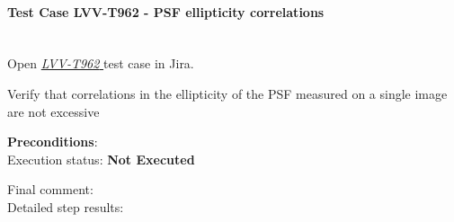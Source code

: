 \documentclass[DM,lsstdraft,STR,toc]{lsstdoc}
\begin{document}
    \paragraph{Test Case LVV-T962 - PSF ellipticity correlations
 }\mbox{}\\

Open  \href{https://jira.lsstcorp.org/secure/Tests.jspa#/testCase/LVV-T962}{\textit{ LVV-T962 } }
test case in Jira.

    Verify that correlations in the ellipticity of the PSF measured on a
single image are not excessive


    \textbf{ Preconditions}:\\
    

    Execution status: {\bf Not Executed }

    Final comment:\\


    Detailed step results:
\end{document}
